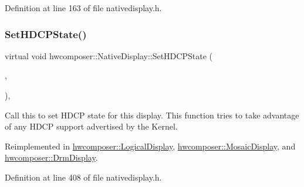 Definition at line 163 of file nativedisplay.\+h.


\begin{DoxyCode}{0}
\end{DoxyCode}
\mbox{\label{classhwcomposer_1_1NativeDisplay_ac65fa12ceb6737a2971cd2faa1a7785d}} 
\subsubsection{\texorpdfstring{Set\+H\+D\+C\+P\+State()}{SetHDCPState()}}
{\footnotesize\ttfamily virtual void hwcomposer\+::\+Native\+Display\+::\+Set\+H\+D\+C\+P\+State (\begin{DoxyParamCaption}\item[{H\+W\+C\+Content\+Protection}]{,  }\item[{H\+W\+C\+Content\+Type}]{ }\end{DoxyParamCaption})\hspace{0.3cm}{\ttfamily [inline]}, {\ttfamily [virtual]}}

Call this to set H\+D\+CP state for this display. This function tries to take advantage of any H\+D\+CP support advertised by the Kernel. 

Reimplemented in \mbox{\hyperlink{classhwcomposer_1_1LogicalDisplay_a161e6fd394b077071d4087314ac1fd8a}{hwcomposer\+::\+Logical\+Display}}, \mbox{\hyperlink{classhwcomposer_1_1MosaicDisplay_a406e652e251f8f88ef628704a1e57b1f}{hwcomposer\+::\+Mosaic\+Display}}, and \mbox{\hyperlink{classhwcomposer_1_1DrmDisplay_a8ea456de0530370e0ad5f57ba4c6d20a}{hwcomposer\+::\+Drm\+Display}}.



Definition at line 408 of file nativedisplay.\+h.


\begin{DoxyCode}{0}
\end{DoxyCode}
\mbox{\label{classhwcomposer_1_1NativeDisplay_ab4214c41977cee260c2703cb01dfd030}} 

